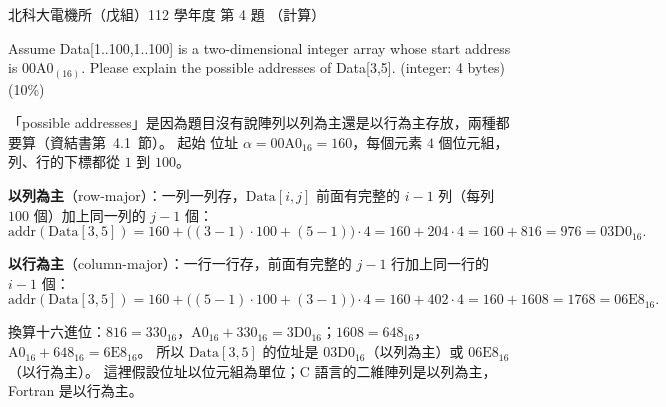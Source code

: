 \begin{pastexam}[label={px:ntut-112-ee-ds-04}]{北科大電機所（戊組）112 學年度 第 4 題}
（計算）

Assume Data[1..100,1..100] is a two-dimensional integer array whose start address is 00A0$_{(16)}$.
Please explain the possible addresses of Data[3,5]. (integer: 4 bytes) (10\%)
\end{pastexam}

\begin{pastsoln}
「possible addresses」是因為題目沒有說陣列以列為主還是以行為主存放，兩種都要算（資結書第~4.1~節）。 起始
位址 $\alpha = 00\mathrm{A0}_{16} = 160$，每個元素 $4$ 個位元組，列、行的下標都從 $1$ 到 $100$。

\textbf{以列為主}（row-major）：一列一列存，$\mathrm{Data}[i, j]$ 前面有完整的 $i - 1$ 列（每列 $100$ 個）加上同一列的
$j - 1$ 個：
\[
\mathrm{addr}(\mathrm{Data}[3,5]) = 160 + \bigl((3-1)\cdot 100 + (5-1)\bigr)\cdot 4 = 160 + 204 \cdot 4 = 160 + 816 = 976 = 03\mathrm{D0}_{16}.
\]

\textbf{以行為主}（column-major）：一行一行存，前面有完整的 $j - 1$ 行加上同一行的 $i - 1$ 個：
\[
\mathrm{addr}(\mathrm{Data}[3,5]) = 160 + \bigl((5-1)\cdot 100 + (3-1)\bigr)\cdot 4 = 160 + 402 \cdot 4 = 160 + 1608 = 1768 = 06\mathrm{E8}_{16}.
\]

換算十六進位：$816 = 330_{16}$，$\mathrm{A0}_{16} + 330_{16} = 3\mathrm{D0}_{16}$；$1608 = 648_{16}$，
$\mathrm{A0}_{16} + 648_{16} = 6\mathrm{E8}_{16}$。 所以 $\mathrm{Data}[3,5]$ 的位址是 $03\mathrm{D0}_{16}$（以列為主）或
$06\mathrm{E8}_{16}$（以行為主）。 這裡假設位址以位元組為單位；C 語言的二維陣列是以列為主，Fortran 是以行為主。
\end{pastsoln}
